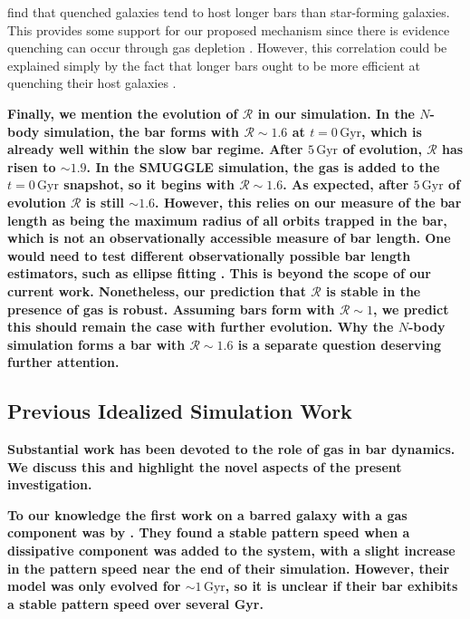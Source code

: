 \documentclass[twocolumn,linenumbers,trackchanges]{aastex631}
\newcommand{\Rot}{\ensuremath{\mathcal{R}}}
\begin{document}
\citet{2020MNRAS.495.4158F} find that quenched galaxies tend to host longer bars
than star-forming galaxies. This provides some support for our proposed
mechanism since there is evidence quenching can occur through gas depletion
\citep[e.g.][]{2021Natur.597..485W}. However, this correlation could be
explained simply by the fact that longer bars ought to be more efficient at
quenching their host galaxies \citep[e.g][]{2015AA...580A.116G}.

{\bf Finally, we mention the evolution of \Rot{} in our simulation. In the
$N$-body simulation, the bar forms with $\Rot\sim1.6$ at $t=0\,\textrm{Gyr}$,
which is already well within the slow bar regime. After $5\,\textrm{Gyr}$ of
evolution, \Rot{} has risen to $\sim1.9$. In the SMUGGLE simulation, the gas is
added to the $t=0\,\textrm{Gyr}$ snapshot, so it begins with $\Rot{}\sim1.6$. As
expected, after $5\,\textrm{Gyr}$ of evolution \Rot{} is still $\sim1.6$.
However, this relies on our measure of the bar length as being the maximum
radius of all orbits trapped in the bar, which is not an observationally
accessible measure of bar length. One would need to test different
observationally possible bar length estimators, such as ellipse fitting
\citep{1990MNRAS.245..130A, 1999AAS..140....1M, 2002MNRAS.330...35A,
2006AA...452...97M, 2009AA...495..491A, 2015AA...576A.102A}. This is beyond the
scope of our current work. Nonetheless, our prediction that \Rot{} is stable in
the presence of gas is robust. Assuming bars form with $\Rot\sim1$, we predict
this should remain the case with further evolution. Why the $N$-body simulation
forms a bar with $\Rot\sim1.6$ is a separate question deserving further
attention.}

\subsection{Previous Idealized Simulation Work}
{\bf Substantial work has been devoted to the role of gas in bar dynamics. We
discuss this and highlight the novel aspects of the present investigation.}

{\bf To our knowledge the first work on a barred galaxy with a gas component was
by \citet{1993AA...268...65F}. They found a stable pattern speed when a
dissipative component was added to the system, with a slight increase in the
pattern speed near the end of their simulation. However, their model was only
evolved for $\sim1\,\textrm{Gyr}$, so it is unclear if their bar exhibits a
stable pattern speed over several Gyr.}
\end{document}
